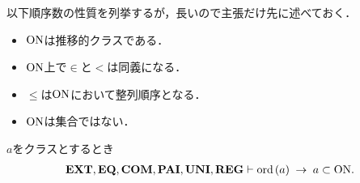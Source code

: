 	以下順序数の性質を列挙するが，長いので主張だけ先に述べておく．
	\begin{itemize}
		\item $\mathrm{ON}$は推移的クラスである．
		\item $\mathrm{ON}$上で$\in$と$<$は同義になる．
		\item $\leq$は$\mathrm{ON}$において整列順序となる．
		\item $\mathrm{ON}$は集合ではない．
	\end{itemize}
	
	\begin{screen}
		\begin{thm}
		\label{thm:transitive_totally_ordered_class}
			$a$をクラスとするとき
			\begin{align}
				\mbox{{\bf EXT}},\mbox{{\bf EQ}},\mbox{\bf COM},\mbox{{\bf PAI}},\mbox{{\bf UNI}},\mbox{{\bf REG}} \vdash 
				\operatorname*{ord}\hspace{0.15em}(a) \hspace{0.25em}\rightarrow\hspace{0.25em} a \subset \mathrm{ON}.
			\end{align}
		\end{thm}
	\end{screen}
	
